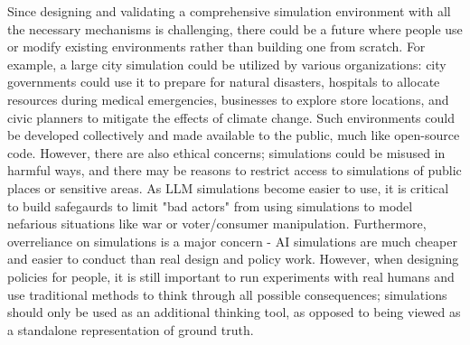 Since designing and validating a comprehensive simulation environment with all the necessary mechanisms is challenging, there could be a future where people use or modify existing environments rather than building one from scratch. For example, a large city simulation could be utilized by various organizations: city governments could use it to prepare for natural disasters, hospitals to allocate resources during medical emergencies, businesses to explore store locations, and civic planners to mitigate the effects of climate change. Such environments could be developed collectively and made available to the public, much like open-source code. However, there are also ethical concerns; simulations could be misused in harmful ways, and there may be reasons to restrict access to simulations of public places or sensitive areas.  As LLM simulations become easier to use, it is critical to build safegaurds to limit "bad actors" from using simulations to model nefarious situations like war or voter/consumer manipulation. Furthermore, overreliance on simulations is a major concern - AI simulations are much cheaper and easier to conduct than real design and policy work. However, when designing policies for people, it is still important to run experiments with real humans and use traditional methods to think through all possible consequences; simulations should only be used as an additional thinking tool, as opposed to being viewed as a standalone representation of ground truth. \color{black}



